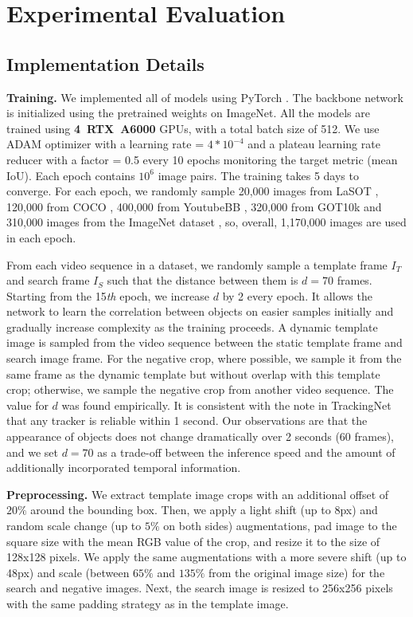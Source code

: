 \documentclass[runningheads]{llncs}
\begin{document}
\section{Experimental Evaluation}\label{section4}

\subsection{Implementation Details}

\textbf{Training.} We implemented all of models using PyTorch \cite{pytorch}. The backbone network is initialized using the pretrained weights on ImageNet. All the models are trained using \textbf{4~RTX~A6000} GPUs, with a total batch size of 512. We use ADAM \cite{ADAM} optimizer with a learning rate = $4 * 10^{-4}$ and a plateau learning rate reducer with a factor = 0.5 every 10 epochs monitoring the target metric (mean IoU). Each epoch contains $10^6$ image pairs. The training takes 5 days to converge.
For each epoch, we randomly sample 20,000 images from LaSOT \cite{LaSOT}, 120,000 from COCO \cite{COCO}, 400,000 from YoutubeBB \cite{YouTubeBB}, 320,000 from GOT10k \cite{GOT10k} and 310,000 images from the ImageNet dataset \cite{ImageNet}, so, overall, 1,170,000 images are used in each epoch. 


From each video sequence in a dataset, we randomly sample a template frame $I_T$ and search frame $I_S$ such that the distance between them is $d = 70$ frames. 
Starting from the 15\textit{th} epoch, we increase $d$ by 2 every epoch. 
It allows the network to learn the correlation between objects on easier samples initially and gradually increase complexity as the training proceeds.
A dynamic template image is sampled from the video sequence between the static template frame and search image frame. 
For the negative crop, where possible, we sample it from the same frame as the dynamic template but without overlap with this template crop; otherwise, we sample the negative crop from another video sequence.
The value for $d$ was found empirically. 
It is consistent with the note in TrackingNet \cite{trackingnet} that any tracker is reliable within 1 second. 
Our observations are that the appearance of objects does not change dramatically over 2 seconds (60 frames), and we set $d = 70$ as a trade-off between the inference speed and the amount of additionally incorporated temporal information.


\textbf{Preprocessing.} We extract template image crops with an additional offset of $20\%$ around the bounding box. 
Then, we apply a light shift (up to 8px) and random scale change (up to $5\%$ on both sides) augmentations, pad image to the square size with the mean RGB value of the crop, and resize it to the size of 128x128 pixels.
We apply the same augmentations with a more severe shift (up to 48px) and scale (between $65\%$ and $135\%$ from the original image size) for the search and negative images. 
Next, the search image is resized to 256x256 pixels with the same padding strategy as in the template image.
\end{document}
